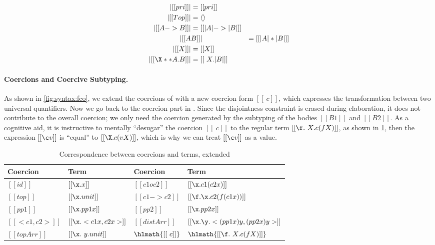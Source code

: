 \begin{definition} \label{def:type:translate:fi}
  \begin{align*}
    | [[pri]] | &= [[pri]] \\
    | [[Top]] | &= \langle \rangle \\
    | [[A -> B]]  | &= [[ | A | -> | B |  ]] \\
    | [[ A & B  ]] | &= [[ | A | * | B |  ]] \\
    | [[ X  ]] | &= [[ X ]] \\
    | [[ \X ** A . B ]] | &= [[ \ X . | B | ]]
  \end{align*}
\end{definition}


\paragraph{Coercions and Coercive Subtyping.}

As shown in \cref{fig:syntax:fco}, we extend the coercions of \tname with a new
coercion form $[[ \ c ]]$, which expresses the transformation between two
universal quantifiers. Now we go back to the coercion part in .
Since the disjointness constraint is erased during elaboration, it does not
contribute to the overall coercion; we only need the coercion generated by the
subtyping of the bodies $[[B1]]$ and $[[B2]]$. As a cognitive aid, it is
instructive to mentally ``desugar'' the coercion $[[\ c]]$ to the regular term
$[[ \f . \ X . c (f X)]]$, as shown in \cref{tab:coercion2}, then the expression
$ [[\c v]] $ is ``equal'' to $[[ \X . c (v X) ]]$, which is why we can treat $[[ \c v]]$ as a value.


\begin{table}[t]
  \centering
\begin{tabular}{|l|l||l|l|}
\hline
\textbf{Coercion} & \textbf{Term} & \textbf{Coercion} & \textbf{Term} \\ \hline
$[[id]]$         & $[[ \x . x]]$  & $[[ c1 o c2  ]]$    &  $[[  \x . c1 (c2 x) ]]$     \\ \hline
$[[top]]$         & $[[ \x . unit ]]$  & $[[ c1 -> c2  ]]$    &  $[[  \f . \x . c2 (f (c1 x))  ]]$     \\ \hline
$[[  pp1   ]]$         & $[[ \x . pp1 x    ]]$  & $[[ pp2  ]]$    &  $[[  \x . pp2 x  ]]$     \\ \hline
$[[  < c1 , c2 >   ]]$         & $[[ \x . < c1 x, c2 x >    ]]$  & $[[ distArr  ]]$    &  $[[  \x . \y . < (pp1 x) y , (pp2 x) y > ]]$     \\ \hline
$[[  topArr   ]]$         & $[[ \x . \ y . unit    ]]$  & $\hlmath{[[ \ c  ]]}$ &  $\hlmath{[[   \f . \ X . c (f X)    ]]}$   \\ \hline
\end{tabular}
  \caption{Correspondence between coercions and terms, extended}
  \label{tab:coercion2}
\end{table}



